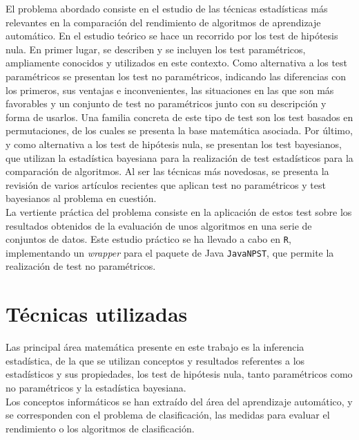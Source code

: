 	El problema abordado consiste en el estudio de las 
técnicas estadísticas más relevantes en la comparación
del rendimiento de algoritmos de aprendizaje automático. 
En el estudio teórico se hace un recorrido por los test 
de hipótesis nula. En primer lugar, se describen y 
se incluyen los test paramétricos, ampliamente conocidos 
y utilizados en este contexto. Como alternativa a los 
test paramétricos se presentan los test no paramétricos, 
indicando las diferencias con los primeros, sus ventajas
e inconvenientes, las situaciones en las que son más 
favorables y un conjunto de test no paramétricos junto con su 
descripción y forma de usarlos. Una familia concreta de 
este tipo de test son los test basados en permutaciones,
de los cuales se presenta la base matemática asociada. Por
último, y como alternativa a los test de hipótesis nula, 
se presentan los test bayesianos, que utilizan la estadística 
bayesiana para la realización de test estadísticos para
la comparación de algoritmos. Al ser las técnicas
más novedosas, se presenta la revisión de varios
artículos recientes que aplican test no paramétricos y test
bayesianos al problema en cuestión.\\
	La vertiente práctica del problema consiste en la 
aplicación de estos test sobre los resultados obtenidos
de la evaluación de unos algoritmos en una serie de
conjuntos de datos. Este estudio práctico se ha llevado
a cabo en \texttt{R}, implementando un \textit{wrapper}
para el paquete de Java \texttt{JavaNPST}, que permite
la realización de test no paramétricos.

\section*{Técnicas utilizadas}

	Las principal área matemática presente en este trabajo es
la inferencia estadística, de la que se utilizan conceptos
y resultados referentes a los estadísticos y sus propiedades,
los test de hipótesis nula, tanto paramétricos como no 
paramétricos y la estadística bayesiana.\\
	Los conceptos informáticos se han extraído del área
del aprendizaje automático, y se corresponden con el 
problema de clasificación, las medidas para evaluar el 
rendimiento o los algoritmos de clasificación.

